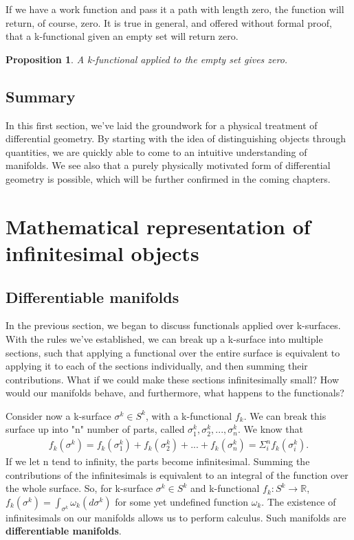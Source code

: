\documentclass{book}
\newtheorem{prop}[equation]{Proposition}
\begin{document}
If we have a work function and pass it a path with length zero, the function will return, of course, zero. It is true in general, and offered without formal proof, that a k-functional given an empty set will return zero. 

\begin{prop}
	A k-functional applied to the empty set gives zero. 
\end{prop}





\section{Summary}


In this first section, we've laid the groundwork for a physical treatment of differential geometry. By starting with the idea of distinguishing objects through quantities, we are quickly able to come to an intuitive understanding of manifolds. We see also that a purely physically motivated form of differential geometry is possible, which will be further confirmed in the coming chapters. 


\chapter{Mathematical representation of infinitesimal objects}


\section{Differentiable manifolds}

In the previous section, we began to discuss functionals applied over k-surfaces. With the rules we've established, we can break up a k-surface into multiple sections, such that applying a functional over the entire surface is equivalent to applying it to each of the sections individually, and then summing their contributions. What if we could make these sections infinitesimally small? How would our manifolds behave, and furthermore, what happens to the functionals?

Consider now a k-surface $\sigma^k \in S^k$, with a k-functional $f_k$. We can break this surface up into "n" number of parts, called $\sigma^k_1, \sigma^k_2, ..., \sigma^k_n$. We know that \begin{gather} f_k(\sigma^k) = f_k(\sigma^k_1) + f_k(\sigma^k_2) + ... + f_k(\sigma^k_n) = \Sigma^n_if_k(\sigma^k_i).\end{gather} If we let n tend to infinity, the parts become infinitesimal. Summing the contributions of the infinitesimals is equivalent to an integral of the function over the whole surface. So, for k-surface $\sigma^k \in S^k$ and k-functional $f_k: S^k \to \mathbb{R}$, $f_k(\sigma^k) = \int_{\sigma^k}\omega_k(d\sigma^k)$ for some yet undefined function $\omega_k$. The existence of infinitesimals on our manifolds allows us to perform calculus. Such manifolds are \textbf{differentiable manifolds}. 
\end{document}
